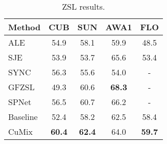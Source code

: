 \documentclass[runningheads]{llncs}
\newcommand{\methodName}{{CuMix} }
\begin{document}
\begin{table*}[t]
			\caption{ZSL results.}\centering
		\begin{tabular}{ l |  c  c  c  c}
		Method&CUB&SUN&AWA1&FLO\\
		\hline
		ALE  \cite{akata2013label}   & 54.9  & 58.1  & 59.9& 48.5   \\
		SJE   \cite{akata2015evaluation}  &  53.9 & 53.7  &   65.6& 53.4 \\
		SYNC   \cite{changpinyo2016synthesized}  &  56.3 & 55.6   & 54.0& -  \\
		GFZSL \cite{verma2017simple}    &  49.3 & 60.6  & \textbf{68.3}&  -  \\
		SPNet \cite{xian2019semantic}    & 56.5  & 60.7  & 66.2& -  \\
		\hline
		Baseline  & 52.4  & 58.2 & 62.5 & 58.4 \\
\methodName      & \textbf{{60.4}} & \textbf{62.4} & 64.0  &\textbf{ 59.7 }\\
		\end{tabular}
		\label{tab:zsl-results-additional}
\end{table*}
 
\end{document}
